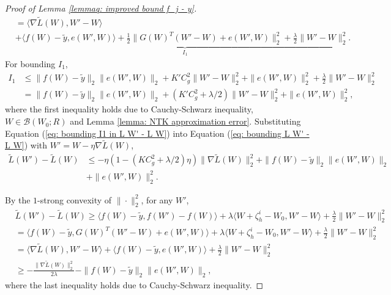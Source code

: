 \documentclass{article} \usepackage{iclr2023/iclr2023_conference,times}
\begin{document}
\begin{proof}[Proof of Lemma \ref{lemmaq: improved bound f_j - y}]
\begin{align}
    &= \langle \nabla \tilde{L}(W), W'-W \rangle  \nonumber\\ 
    &+ \underbrace{\langle f(W) - \tilde{y}, e(W',W) \rangle + \frac{1}{2} \| G(W)^T (W' - W) + e(W',W) \|_2^2 + \frac{\lambda}{2} \| W' - W\|_2^2}_{I_1}. 
    \label{eq: bounding L W' - L W}
\end{align}
For bounding $I_1$, 
\begin{align}
    I_1 &\leq \| f(W) - \tilde{y} \|_2 \| e(W',W) \|_2 +  K' C^2_g \|W' - W\|_2^2 + \|e(W',W) \|_2^2 + \frac{\lambda}{2} \| W' - W\|_2^2 \nonumber \\ 
    &= \| f(W) - \tilde{y} \|_2 \| e(W',W) \|_2 +  (K' C^2_g + \lambda/2) \|W' - W\|_2^2 + \|e(W',W) \|_2^2,
    \label{eq: bounding I1 in  L W' - L W}
\end{align}
where the first inequality holds due to Cauchy-Schwarz inequality, $W \in \mathcal{B}(W_0; R)$ and Lemma \ref{lemma: NTK approximation error}. Substituting Equation (\ref{eq: bounding I1 in  L W' - L W}) into Equation (\ref{eq: bounding L W' - L W}) with $W' = W - \eta \nabla \tilde{L}(W)$,
\begin{align}
    \tilde{L}(W') - \tilde{L}(W) &\leq -\eta (1 - (K C_g^2 + \lambda/2) \eta) \| \nabla \tilde{L}(W) \|_2^2 + \| f(W) - \tilde{y} \|_2 \| e(W',W) \|_2 \nonumber\\
    &+ \|e(W',W) \|_2^2. 
    \label{eq: bounding L W' - L W more explicit}
\end{align}

By the $1$-strong convexity of $\| \cdot\|_2^2$, for any $W'$,
\begin{align}
    &\tilde{L}(W') - \tilde{L}(W) \geq \langle f(W) - \tilde{y}, f(W') - f(W) \rangle  + \lambda \langle W + \zeta^i_h - W_0, W' - W \rangle + \frac{\lambda}{2} \| W' - W\|_2^2 \nonumber \\
    &= \langle f(W) - \tilde{y}, G(W)^T (W' - W) + e(W',W) \rangle + \lambda \langle W + \zeta^i_h - W_0, W' - W \rangle + \frac{\lambda}{2} \| W' - W\|_2^2 \nonumber \\ 
    &= \langle \nabla \tilde{L}(W), W'-W \rangle + \langle f(W) - \tilde{y}, e(W',W) \rangle  + \frac{\lambda}{2} \| W' - W\|_2^2 \nonumber \\
     &\geq - \frac{\| \nabla \tilde{L}(W) \|_2^2}{2 \lambda} - \| f(W) - \tilde{y} \|_2 \| e(W',W)\|_2, 
     \label{eq: bound L W' L W by strong convexity}
\end{align}
where the last inequality holds due to Cauchy-Schwarz inequality. 


\end{proof}
\end{document}
